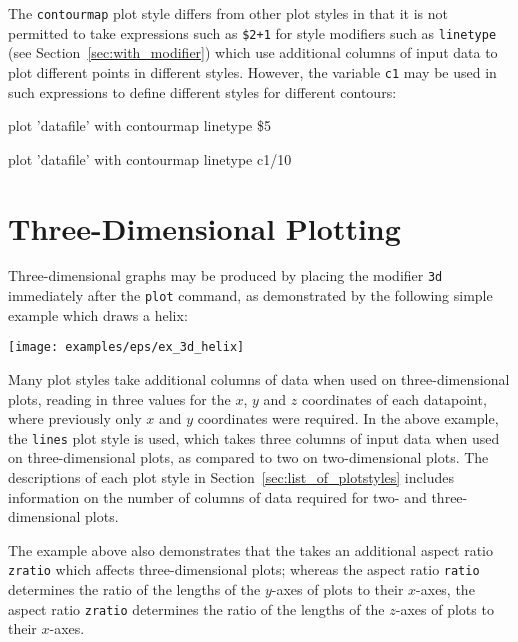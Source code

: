The {\tt contourmap} plot style differs from other plot styles in that it is
not permitted to take expressions such as {\tt \$2+1} for style modifiers such
as {\tt linetype} (see Section~\ref{sec:with_modifier}) which use additional
columns of input data to plot different points in different styles. However,
the variable {\tt c1} may be used in such expressions to define different
styles for different contours:

\begin{dontdo}
plot 'datafile' with contourmap linetype \$5
\end{dontdo}

\begin{dodo}
plot 'datafile' with contourmap linetype c1/10
\end{dodo}

\section{Three-Dimensional Plotting}
\label{sec:threedim}

Three-dimensional graphs may be produced by placing the modifier {\tt 3d}
immediately after the {\tt plot} command, as demonstrated by the following
simple example which draws a helix:

\vspace{2mm}
\newline
{}\newline
{}\newline
{}

\vspace{2mm}
\centerline{\texttt{[image: examples/eps/ex\_3d\_helix]}}
\vspace{2mm}

Many plot styles take additional columns of data when used on
three-dimen\-sional plots, reading in three values for the $x$, $y$ and $z$
coordinates of each datapoint, where previously only $x$ and $y$ coordinates
were required. In the above example, the {\tt lines} plot style is used, which
takes three columns of input data when used on three-dimensional plots, as
compared to two on two-dimensional plots.  The descriptions of each plot style
in Section~\ref{sec:list_of_plotstyles} includes information on the number of
columns of data required for two- and three-dimensional plots. 

The example above also demonstrates that the  takes an
additional aspect ratio {\tt zratio} which affects three-dimensional plots;
whereas the aspect ratio {\tt ratio} determines the ratio of the lengths of the
$y$-axes of plots to their $x$-axes, the aspect ratio {\tt zratio} determines
the ratio of the lengths of the $z$-axes of plots to their $x$-axes.

